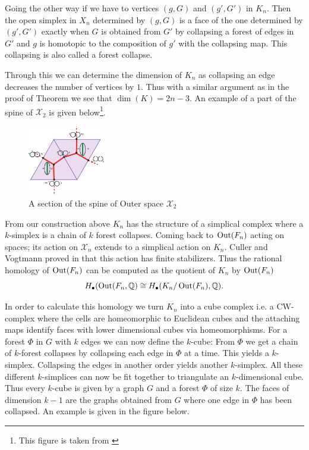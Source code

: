 Going the other way if we have to vertices $(g,G)$ and $(g',G')$ in $K_{n}$. Then the open simplex in $X_{n}$ 
determined by $(g,G)$ is a face of  the one determined by $(g',G')$ exactly when $G$ is obtained from $G'$ 
by collapsing a forest of edges in $G'$ and  $g$ is homotopic to the composition of $g'$ with the collapsing map.
This collapsing is also called a forest collapse.

Through this we can determine the dimension of $K_{n}$ as collapsing an edge decreases the number of vertices by $1$.
Thus with a similar argument as in the proof of Theorem \label{thm:finGenCn} we see that $\dim(K) = 2n -3$.
An example of a part of the spine of $\mathcal{X}_{2}$ is given below\footnote{This figure is taken from \cite{vogtmann02}}. 

\begin{figure}[h]
	\centering
	\includegraphics[width=0.3\textwidth]{./Images/spineOfOuterSpace.pdf}
	\caption{A section of the spine of Outer space $\mathcal{X}_{2}$}
\end{figure}

From our construction above $K_{n}$ has the structure of a simplical complex where a $k$-simplex
is a chain of $k$ forest collapses. Coming back to $\operatorname{Out}(F_{n})$ acting on spaces; its action on $\mathcal{X}_{n}$ extends to a simplical action on $K_{n}$.
Culler and Vogtmann proved in \cite{vogtmann86} that this action has finite stabilizers.
Thus the rational homology of $\operatorname{Out}(F_{n})$ can be computed as the quotient of $K_{n}$ by $\operatorname{Out}(F_{n})$
\[
	H_{\bullet}(\operatorname{Out}(F_{n},\mathbb{Q}) \cong H_{\bullet}(K_{n}/ \operatorname{Out}(F_{n}),\mathbb{Q})
.\] 

In order to calculate this homology we turn $K_{n}$ into a cube complex i.e. a CW-complex where the cells are homeomorphic
to Euclidean cubes and the attaching maps identify faces with lower dimensional cubes via homeomorphisms.
For a forest $\Phi$ in $G$ with $k$ edges we can now define the $k$-cube:
From $\Phi$ we get a chain of $k$-forest collapses by collapsing each edge in $\Phi$ at a time.
This yields a $k$-simplex. Collapsing the edges in another order yields another $k$-simplex.
All these different $k$-simplices can now be fit together to triangulate an $k$-dimensional cube.
Thus every $k$-cube is given by a graph $G$ and a forest $\Phi$ of size $k$.
The faces of dimension $k-1$ are the graphs obtained from $G$ where one edge in $\Phi$ has been collapsed.
An example is given in the figure below.

